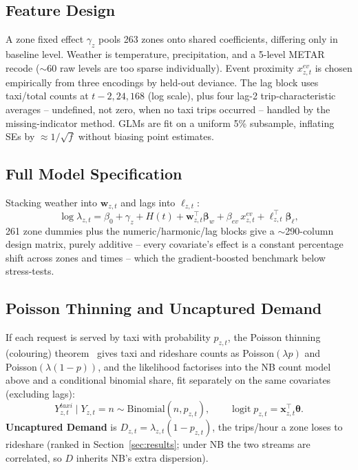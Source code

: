 \documentclass[11pt]{article}
\begin{document}
\subsection{Feature Design}
\label{sec:feature_design}

A zone fixed effect $\gamma_z$ pools 263 zones onto shared coefficients, differing only in baseline level. Weather is temperature, precipitation, and a 5-level METAR recode ($\sim$60 raw levels are too sparse individually). Event proximity $x^{ev}_{z,t}$ is chosen empirically from three encodings by held-out deviance. The lag block uses taxi/total counts at $t{-}2,24,168$ (log scale), plus four lag-2 trip-characteristic averages -- undefined, not zero, when no taxi trips occurred -- handled by the missing-indicator method. GLMs are fit on a uniform 5\% subsample, inflating SEs by $\approx 1/\sqrt f$ without biasing point estimates.

\subsection{Full Model Specification}

Stacking weather into $\mathbf{w}_{z,t}$ and lags into $\boldsymbol\ell_{z,t}$:
\begin{equation}
    \log \lambda_{z,t} = \beta_0 + \gamma_z + H(t) + \mathbf{w}_{z,t}^\top \boldsymbol\beta_w + \beta_{ev}\, x^{ev}_{z,t} + \boldsymbol\ell_{z,t}^\top \boldsymbol\beta_\ell,
\end{equation}
261 zone dummies plus the numeric/harmonic/lag blocks give a $\sim$290-column design matrix, purely additive -- every covariate's effect is a constant percentage shift across zones and times -- which the gradient-boosted benchmark below stress-tests.

\subsection{Poisson Thinning and Uncaptured Demand}

If each request is served by taxi with probability $p_{z,t}$, the Poisson thinning (colouring) theorem~\cite{ross_probability_models} gives taxi and rideshare counts as Poisson$(\lambda p)$ and Poisson$(\lambda(1-p))$, and the likelihood factorises into the NB count model above and a conditional binomial share, fit separately on the same covariates (excluding lags):
\begin{equation}
    Y^{taxi}_{z,t} \mid Y_{z,t} = n \sim \text{Binomial}(n, p_{z,t}), \qquad \operatorname{logit} p_{z,t} = \mathbf{x}_{z,t}^\top \boldsymbol\theta.
\end{equation}
\textbf{Uncaptured Demand} is $D_{z,t} = \lambda_{z,t}(1-p_{z,t})$, the trips/hour a zone loses to rideshare (ranked in Section~\ref{sec:results}; under NB the two streams are correlated, so $D$ inherits NB's extra dispersion).
\end{document}
